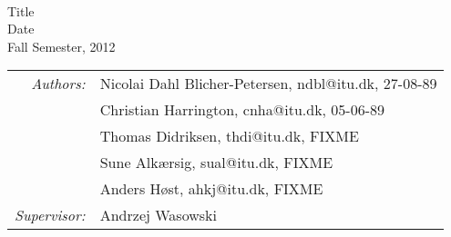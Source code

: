\documentclass{llncs}
\begin{document}
\begin{titlepage}
\ \\
\vspace{3cm}
\begin{center}
{\huge\sffamily
Title
\\}\bigskip
{\large\sffamily
Date
\\}
{\sffamily Fall Semester, 2012}
\end{center}
\vspace{3cm}
\large
\begin{center}
\begin{tabular}{r@{  }l}
\emph{\sffamily Authors:} & \textsf{Nicolai Dahl Blicher-Petersen, ndbl@itu.dk, 27-08-89}\\
 & \textsf{Christian Harrington, cnha@itu.dk, 05-06-89}\\
 & \textsf{Thomas Didriksen, thdi@itu.dk, FIXME}\\
 & \textsf{Sune Alkærsig, sual@itu.dk, FIXME}\\
 & \textsf{Anders Høst, ahkj@itu.dk, FIXME}\\
\emph{\sffamily Supervisor:} & \textsf{Andrzej Wasowski}
\end{tabular}
\end{center}
\vfill
\end{titlepage}

%

\tableofcontents

\listoffigures

%
\end{document}
